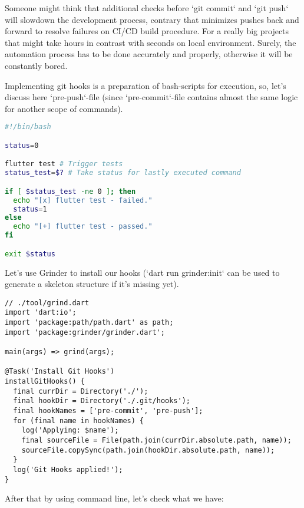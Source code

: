 Someone might think that additional checks before `git commit` and `git push` will slowdown the development process, 
contrary that minimizes pushes back and forward to resolve failures on CI/CD build procedure. For a really big projects
that might take hours in contrast with seconds on local environment. Surely, the automation process has to be done
accurately and properly, otherwise it will be constantly bored.

Implementing git hooks is a preparation of bash-scripts for execution, so, let's discuss here `pre-push`-file (since
`pre-commit`-file contains almost the same logic for another scope of commands).

\begin{lstlisting}[language=bash]
#!/bin/bash

status=0

flutter test # Trigger tests
status_test=$? # Take status for lastly executed command

if [ $status_test -ne 0 ]; then
  echo "[x] flutter test - failed."
  status=1
else
  echo "[+] flutter test - passed."
fi

exit $status
\end{lstlisting}

\noindent Let's use Grinder to install our hooks (`dart run grinder:init` can be used to generate a skeleton 
structure if it's missing yet).

\begin{lstlisting}
// ./tool/grind.dart
import 'dart:io';
import 'package:path/path.dart' as path;
import 'package:grinder/grinder.dart';

main(args) => grind(args);

@Task('Install Git Hooks')
installGitHooks() {
  final currDir = Directory('./');
  final hookDir = Directory('./.git/hooks');
  final hookNames = ['pre-commit', 'pre-push'];
  for (final name in hookNames) {
    log('Applying: $name');
    final sourceFile = File(path.join(currDir.absolute.path, name));
    sourceFile.copySync(path.join(hookDir.absolute.path, name));
  }
  log('Git Hooks applied!');
}
\end{lstlisting}

\noindent After that by using command line, let's check what we have:


